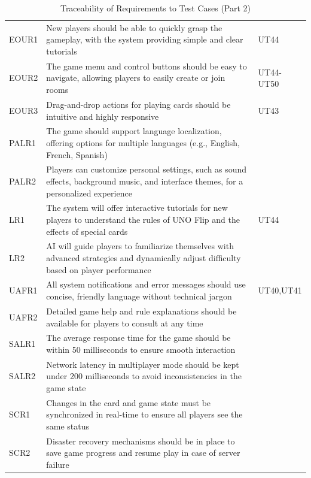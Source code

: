 \documentclass[12pt, titlepage]{article}
\begin{document}
\begin{table}[H]
    \centering
    \begin{tabularx}{\textwidth}{|l|X|l|}
        \hline
        EOUR1 & New players should be able to quickly grasp the gameplay, with the system providing simple and clear tutorials & UT44 \\
        EOUR2 & The game menu and control buttons should be easy to navigate, allowing players to easily create or join rooms & UT44-UT50 \\
        EOUR3 & Drag-and-drop actions for playing cards should be intuitive and highly responsive & UT43 \\
        PALR1 & The game should support language localization, offering options for multiple languages (e.g., English, French, Spanish) & \\
        PALR2 & Players can customize personal settings, such as sound effects, background music, and interface themes, for a personalized experience &  \\
        LR1 & The system will offer interactive tutorials for new players to understand the rules of UNO Flip and the effects of special cards & UT44 \\
        LR2 & AI will guide players to familiarize themselves with advanced strategies and dynamically adjust difficulty based on player performance &  \\
        UAFR1 & All system notifications and error messages should use concise, friendly language without technical jargon & UT40,UT41 \\
        UAFR2 & Detailed game help and rule explanations should be available for players to consult at any time &  \\
        SALR1 & The average response time for the game should be within 50 milliseconds to ensure smooth interaction &  \\
        SALR2 & Network latency in multiplayer mode should be kept under 200 milliseconds to avoid inconsistencies in the game state &  \\
        SCR1 & Changes in the card and game state must be synchronized in real-time to ensure all players see the same status &  \\
        SCR2 & Disaster recovery mechanisms should be in place to save game progress and resume play in case of server failure &  \\
        \hline
    \end{tabularx}
    \caption{Traceability of Requirements to Test Cases (Part 2)}
    \label{tab:trace_requirements_2}
\end{table}
\end{document}
